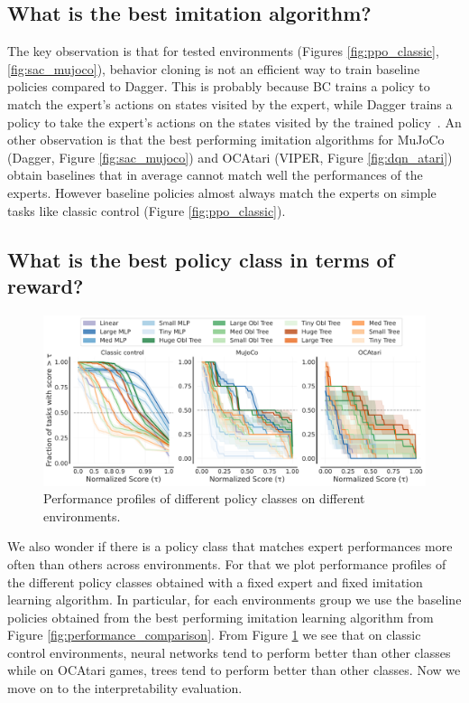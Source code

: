 \subsection{What is the best imitation algorithm?}

The key observation is that for tested environments (Figures \ref{fig:ppo_classic},\ref{fig:sac_mujoco}), behavior cloning is not an efficient way to train baseline policies compared to Dagger.
This is probably because BC trains a policy to match the expert's actions on states visited by the expert, while Dagger trains a policy to take the expert's actions on the states visited by the trained policy~\cite{dagger}.
An other observation is that the best performing imitation algorithms for MuJoCo (Dagger, Figure \ref{fig:sac_mujoco}) and OCAtari (VIPER, Figure \ref{fig:dqn_atari}) obtain baselines that in average cannot match well the performances of the experts.
However baseline policies almost always match the experts on simple tasks like classic control (Figure \ref{fig:ppo_classic}).

\subsection{What is the best policy class in terms of reward?}

\begin{figure}[ht]
    \centering
    \includegraphics[trim={0 0 0 0.2cm},clip,width=0.9\linewidth]{images/images_part3/perf_profile_combined_100k.pdf}
    \caption{Performance profiles of different policy classes on different environments.}
    \label{fig:perf-combined}
\end{figure}

We also wonder if there is a policy class that matches expert performances more often than others across environments.
For that we plot performance profiles of the different policy classes obtained with a fixed expert and fixed imitation learning algorithm.
In particular, for each environments group we use the baseline policies obtained from the best performing imitation learning algorithm from Figure \ref{fig:performance_comparison}.
From Figure \ref{fig:perf-combined} we see that on classic control environments, neural networks tend to perform better than other classes while on OCAtari games, trees tend to perform better than other classes.
Now we move on to the interpretability evaluation.

